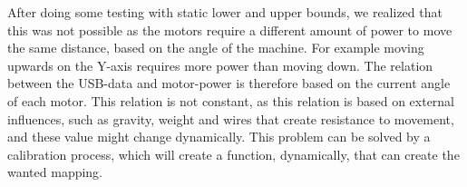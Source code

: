 After doing some testing with static lower and upper bounds, we realized that this was not possible as the motors require a different amount of power to move the same distance, based on the angle of the machine.
For example moving upwards on the Y-axis requires more power than moving down.
The relation between the USB-data and motor-power is therefore based on the current angle of each motor.
This relation is not constant, as this relation is based on external influences, such as gravity, weight and wires that create resistance to movement, and these value might change dynamically.
This problem can be solved by a calibration process, which will create a function, dynamically, that can create the wanted mapping.
